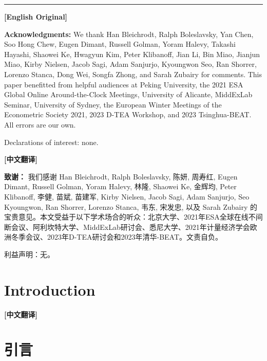 \documentclass[12pt,a4paper]{ctexart}
\newenvironment{original}{%
  \par\medskip\noindent\textbf{[English Original]}\par\smallskip
  \color{black}\small
}{%
  \par\medskip
}
\newenvironment{translation}{%
  \par\noindent\textbf{[中文翻译]}\par\smallskip
  \color{blue}\small
}{%
  \par\bigskip
}
\theoremstyle{definition}
\theoremstyle{remark}
\begin{document}
\vspace{12pt}
\noindent\rule{\textwidth}{0.4pt}

\begin{original}
\textbf{Acknowledgments:} We thank Han Bleichrodt, Ralph Boleslavsky, Yan Chen, Soo Hong Chew, Eugen Dimant, Russell Golman, Yoram Halevy, Takashi Hayashi, Shaowei Ke, Hwagyun Kim, Peter Klibanoff, Jian Li, Bin Miao, Jianjun Miao, Kirby Nielsen, Jacob Sagi, Adam Sanjurjo, Kyoungwon Seo, Ran Shorrer, Lorenzo Stanca, Dong Wei, Songfa Zhong, and Sarah Zubairy for comments. This paper benefitted from helpful audiences at Peking University, the 2021 ESA Global Online Around-the-Clock Meetings, University of Alicante, MiddExLab Seminar, University of Sydney, the European Winter Meetings of the Econometric Society 2021, 2023 D-TEA Workshop, and 2023 Tsinghua-BEAT. All errors are our own.

Declarations of interest: none.
\end{original}
\begin{translation}
\textbf{致谢：} 我们感谢 Han Bleichrodt, Ralph Boleslavsky, 陈妍, 周寿红, Eugen Dimant, Russell Golman, Yoram Halevy, 林隆, Shaowei Ke, 金辉均, Peter Klibanoff, 李健, 苗斌, 苗建军, Kirby Nielsen, Jacob Sagi, Adam Sanjurjo, Seo Kyoungwon, Ran Shorrer, Lorenzo Stanca, 韦东, 宋发忠, 以及 Sarah Zubairy 的宝贵意见。本文受益于以下学术场合的听众：北京大学、2021年ESA全球在线不间断会议、阿利坎特大学、MiddExLab研讨会、悉尼大学、2021年计量经济学会欧洲冬季会议、2023年D-TEA研讨会和2023年清华-BEAT。文责自负。

利益声明：无。
\end{translation}

\newpage

\section{Introduction}
\begin{translation}
\section*{引言}
\end{translation}
\end{document}
